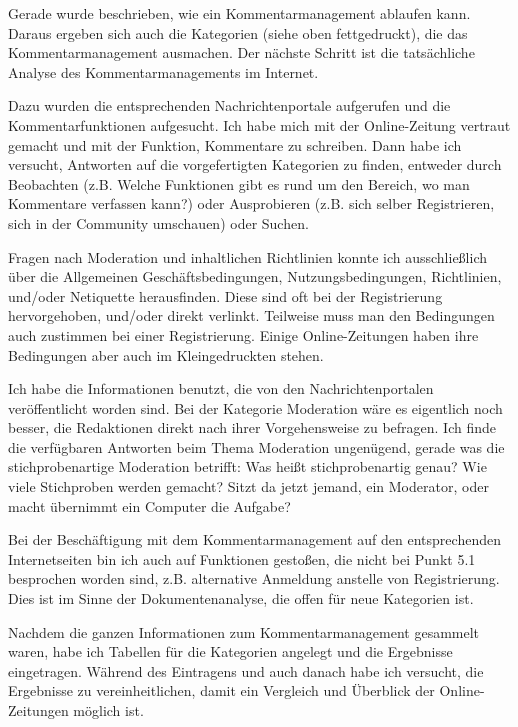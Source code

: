 \begin{itemize}
    Gerade wurde beschrieben, wie ein Kommentarmanagement ablaufen
    kann. Daraus ergeben sich auch die Kategorien (siehe oben fettgedruckt),
    die das Kommentarmanagement ausmachen.
   Der nächste Schritt ist die tatsächliche Analyse des Kommentarmanagements im 
   Internet. 
    
    Dazu wurden die entsprechenden Nachrichtenportale aufgerufen und die
    Kommentarfunktionen aufgesucht. Ich habe mich mit der Online-Zeitung vertraut
    gemacht und mit der Funktion, Kommentare zu schreiben. 
    Dann habe ich versucht, Antworten auf die vorgefertigten Kategorien zu finden,
    entweder durch Beobachten (z.B. Welche Funktionen gibt es rund um den Bereich,
    wo man Kommentare verfassen kann?) oder Ausprobieren (z.B. sich selber
    Registrieren, sich in der Community umschauen) oder Suchen.
    
    Fragen nach Moderation und inhaltlichen Richtlinien konnte ich ausschließlich 
    über die Allgemeinen Geschäftsbedingungen, Nutzungsbedingungen, Richtlinien,
    und/oder Netiquette herausfinden. Diese sind oft bei der Registrierung hervorgehoben,
    und/oder direkt verlinkt. Teilweise muss man den Bedingungen auch zustimmen bei einer
    Registrierung. Einige Online-Zeitungen haben ihre Bedingungen aber auch im 
    \glqq Kleingedruckten\grqq\- stehen.
    
    Ich habe die Informationen benutzt, die von den Nachrichtenportalen veröffentlicht
    worden sind. Bei der Kategorie \glqq Moderation\grqq\- wäre es eigentlich noch besser, 
    die Redaktionen direkt nach ihrer Vorgehensweise zu befragen. Ich finde die 
    verfügbaren Antworten beim Thema Moderation ungenügend,
    gerade was die \glqq stichprobenartige\grqq\- Moderation betrifft: Was heißt stichprobenartig genau?
    Wie viele Stichproben werden gemacht? Sitzt da jetzt jemand, ein Moderator, oder macht übernimmt  
    ein Computer die Aufgabe?
    
    Bei der Beschäftigung mit dem Kommentarmanagement auf den entsprechenden Internetseiten
    bin ich auch auf Funktionen gestoßen, die nicht bei Punkt 5.1
    besprochen worden sind, z.B.  \glqq alternative Anmeldung\grqq\- anstelle von Registrierung.
    Dies ist im Sinne der Dokumentenanalyse, die offen für neue Kategorien ist.
    
    Nachdem die ganzen Informationen zum Kommentarmanagement gesammelt waren, 
    habe ich Tabellen für die Kategorien angelegt und die Ergebnisse eingetragen.
    Während des Eintragens und auch danach habe ich versucht, die Ergebnisse zu 
    vereinheitlichen, damit ein Vergleich und Überblick der Online-Zeitungen möglich ist. 
    

\end{itemize}
